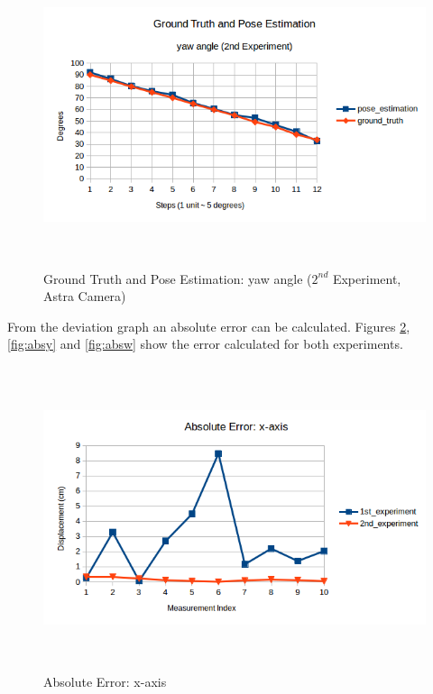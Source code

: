 \begin{figure}[!h]
\begin{center}
\includegraphics[width=5in, height=3.5in]{figures05/2_yaw_validation.png}
\caption{Ground Truth and Pose Estimation: yaw angle ($2^{nd}$ Experiment, Astra Camera)}
\label{fig:erroryaw_2nd}
\end{center}
\end{figure}

From the deviation graph an absolute error can be calculated. Figures \ref{fig:absx}, \ref{fig:absy} and \ref{fig:absw} show the error calculated for both experiments.

\begin{figure}[!h]
\begin{center}
\includegraphics[width=5in, height=3.5in]{figures05/abs_error_x.png}
\caption{Absolute Error: x-axis}
\label{fig:absx}
\end{center}
\end{figure}

